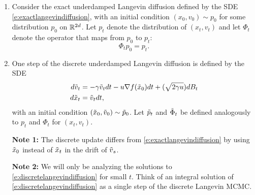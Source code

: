 \begin{enumerate}
\item Consider the exact underdamped Langevin diffusion defined by the SDE \eqref{e:exactlangevindiffusion}, with an initial condition $(x_0,v_0)\sim p_0$ for some distribution $p_0$ on $\mathbb{R}^{2d}$. Let $p_t$ denote the distribution of $(x_t,v_t)$ and let $\Phi_t$ denote the operator that maps from $p_0$ to $p_t$:
\begin{equation}\label{d:phi}
\Phi_t  p_0 = p_t.
\end{equation}
\item One step of the discrete underdamped Langevin diffusion is defined by the SDE
\begin{align}
\label{e:discretelangevindiffusion}
d\tilde{v}_t &= -\gamma \tilde{v}_t dt -u \nabla f(\tilde{x}_0) dt + (\sqrt{2\gamma u}) dB_t \\
d \tilde{x}_t &= \tilde{v}_t dt, \nonumber
\end{align}
with an initial condition $(\tilde{x}_0,\tilde{v}_0)\sim \tilde{p}_0$.
Let $\tilde{p}_t$ and $\tilde{\Phi}_t$ be defined analogously to $p_t$ and $\Phi_t$ for $(x_t,v_t)$.

\textbf{Note 1:} The discrete update differs from \eqref{e:exactlangevindiffusion} by using $\tilde{x}_0$ instead of $\tilde{x}_t$ in the drift of $\tilde{v}_s$.

\textbf{Note 2:} We will only be analyzing the solutions to \eqref{e:discretelangevindiffusion} for small $t$. Think of an integral solution of \eqref{e:discretelangevindiffusion} as a single step of the discrete Langevin MCMC.
\end{enumerate}
